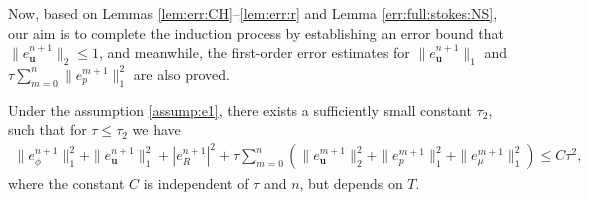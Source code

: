 Now, based on Lemmas \ref{lem:err:CH}--\ref{lem:err:r} and Lemma \ref{err:full:stokes:NS}, our aim is to complete the induction process by establishing an error bound that $\|e_{\bm u}^{n+1}\|_2 \le 1$, and meanwhile, the first-order error estimates for $\|e_{\bm u}^{n+1}\|_1$  and $\tau \sum_{m=0}^n  \|e_p^{m+1}\|_1^2$ are also proved.
\begin{theorem} \label{err:full:stokes:all}
	Under the assumption \eqref{assump:e1},   there exists a sufficiently small constant $\tau_2$, such that for $\tau \le \tau_2$ we have
	\begin{equation*}
		\begin{aligned}
			\|e_\phi^{n+1}\|_1^2 + \|e_{\bm u}^{n+1}\|_1^2 +|e_R^{n+1}|^2  +\tau \sum_{m=0}^n (\|e_{\bm u}^{m+1}\|_2^2+\|e_p^{m+1}\|_1^2+\|e_\mu^{m+1}\|_1^2)   \le C \tau^2,
		\end{aligned}
	\end{equation*}
where the constant $C$ is independent of $\tau$ and $n$, but depends on $T$.
\end{theorem}
